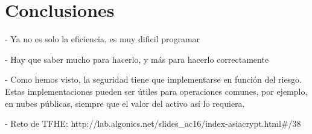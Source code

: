 \chapter{Conclusiones}
\label{chap:conclusiones}

- Ya no es solo la eficiencia, es muy dificil programar

- Hay que saber mucho para hacerlo, y más para hacerlo correctamente \cite{peng_danger_2019}

- Como hemos visto, la seguridad tiene que implementarse en función del riesgo. Estas implementaciones pueden ser útiles para operaciones comunes, por ejemplo, en nubes públicas, siempre que el valor del activo así lo requiera.

- Reto de TFHE: http://lab.algonics.net/slides_ac16/index-asiacrypt.html#/38